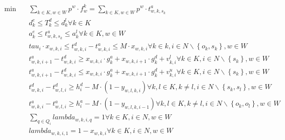 \begin{align}
  \min\quad & \sum_{k \in K, w \in W} p^{w} \cdot f_{w}^{k} = \sum_{k \in K, w \in W} p^{w} \cdot t_{w , k , s_{k}}^{a} \tag{eq\_0002} \\
  & d_{k}^{e} \leq T_{k}^{d} \leq d_{k}^{l} \forall k \in K \tag{eq\_0003} \\
  & a_{k}^{e} \leq t_{w , k , s_{k}}^{a} \leq a_{k}^{l} \forall k \in K , w \in W \tag{eq\_0004} \\
  & \mathit{tau}_{i} \cdot x_{w , k , i} \leq t_{w , k , i}^{d} - t_{w , k , i}^{a} \leq M \cdot x_{w , k , i} \forall k \in k , i \in N \backslash \left\{o_{k} , s_{k}\right\} , w \in W \tag{eq\_0005} \\
  & t_{w , k , i + 1}^{a} - t_{w , k , i}^{d} \geq x_{w , k , i} \cdot g_{k}^{a} + x_{w , k , i + 1} \cdot g_{k}^{d} + v_{k , i}^{l} \forall k \in K , i \in N \backslash \left\{s_{k}\right\} , w \in W \tag{eq\_0006} \\
  & t_{w , k , i + 1}^{a} - t_{w , k , i}^{d} \leq x_{w , k , i} \cdot g_{k}^{a} + x_{w , k , i + 1} \cdot g_{k}^{d} + v_{k , i}^{u} \forall k \in K , i \in N \backslash \left\{s_{k}\right\} , w \in W \tag{eq\_0008} \\
  & t_{w , k , i}^{d} - t_{w , l , i}^{d} \geq h_{i}^{d} - M \cdot \left(1 - y_{w , l , k , i}\right) \forall k , l \in K , k \neq l , i \in N \backslash \left\{s_{k} , s_{l}\right\} , w \in W \tag{eq\_0010} \\
  & t_{w , k , i}^{a} - t_{w , l , i}^{a} \geq h_{i}^{a} - M \cdot \left(1 - y_{w , l , k , i - 1}\right) \forall k , l \in K , k \neq l , i \in N \backslash \left\{o_{k} , o_{l}\right\} , w \in W \tag{eq\_0011} \\
  & \sum_{q \in Q_{i}} \mathit{lambda}_{w , k , i , q} = 1 \forall k \in K , i \in N , w \in W \tag{eq\_0012} \\
  & \mathit{lambda}_{w , k , i , 1} = 1 - x_{w , k , i} \forall k \in K , i \in N , w \in W \tag{eq\_0013} \\

\end{align}
